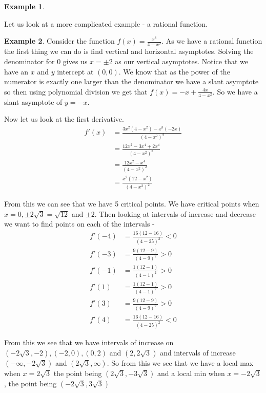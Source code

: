 \documentclass[12pt,reqno]{article}
\theoremstyle{definition}
\newtheorem*{Example}{Example}
\begin{document}
\begin{Example}
\end{Example}

Let us look at a more complicated example - a rational function. 
\begin{Example}
	Consider the function $f(x) = \frac{x^3}{4- x^2}$. As we have a rational function the first thing we can do is find vertical and horizontal asymptotes. Solving the denominator for 0 gives us $x = \pm 2$ as our vertical asymptotes. Notice that we have an $x$ and $y$ intercept at $(0,0)$. We know that as the power of the numerator is exactly one larger than the denominator we have a slant asymptote so then using polynomial division we get that $f(x) = -x + \frac{4x}{4 - x^2}$. So we have a slant asymptote of $y = -x$. 

	Now let us look at the first derivative. 
	\begin{align*}
		f'(x) &= \frac{3x^2 (4 - x^2) - x^3(-2x)}{(4 - x^2)^2} \\ 
		      &= \frac{12x^2 - 3x^4 + 2x^4}{(4 - x^2)^2} \\
			  &= \frac{12x^2 - x^4}{(4 - x^2)^2} \\
			  &= \frac{x^2 (12 - x^2)}{(4 - x^2)^2}
	\end{align*}
	
	From this we can see that we have 5 critical points. We have critical points when $x = 0, \pm 2 \sqrt{3} = \sqrt{12}$ and $\pm 2$. Then looking at intervals of increase and decrease we want to find points on each of the intervals - 
	\begin{align*}
		f'(-4) &= \frac{16 (12 - 16)}{(4 - 25)^2} < 0 \\
		f'(-3) &= \frac{9 (12 - 9)}{(4 - 9)^2} > 0 \\
		f'(-1) &= \frac{1 (12 - 1)}{(4 - 1)^2} > 0 \\
		f'(1) &= \frac{1 (12 - 1)}{(4 - 1)^2} > 0 \\
		f'(3) &= \frac{9 (12 - 9)}{(4 - 9)^2} > 0 \\
		f'(4) &= \frac{16(12 - 16)}{(4 - 25)^2} < 0
	\end{align*}
	
	From this we see that we have intervals of increase on $(-2\sqrt{3}, -2), (-2, 0), (0, 2)$ and $(2, 2\sqrt{3})$ and intervals of increase $(-\infty, -2\sqrt{3})$ and $(2\sqrt{3}, \infty)$. So from this we see that we have a local max when $x = 2\sqrt{3}$ the point being $(2\sqrt{3}, -3\sqrt{3})$ and a local min when $x = -2\sqrt{3}$, the point being $(-2\sqrt{3}, 3\sqrt{3})$ 
	

\end{Example}
\end{document}

